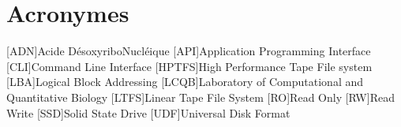 
\chapter*{Acronymes}
\begin{acronym}
	[ADN]{Acide DésoxyriboNucléique}
	[API]{Application Programming Interface}
	[CLI]{Command Line Interface}
	[HPTFS]{High Performance Tape File system}
	[LBA]{Logical Block Addressing}
	[LCQB]{Laboratory of Computational and Quantitative Biology}
	[LTFS]{Linear Tape File System}
	[RO]{Read Only}
	[RW]{Read Write}
	[SSD]{Solid State Drive}
	[UDF]{Universal Disk Format}
\end{acronym}
